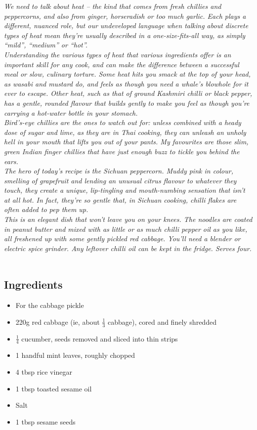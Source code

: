 \documentclass{book}
\begin{document}
\emph{We need to talk about heat – the kind that comes from fresh chillies and peppercorns, and also from ginger, horseradish or too much garlic. Each plays a different, nuanced role, but our undeveloped language when talking about discrete types of heat mean they’re usually described in a one-size-fits-all way, as simply “mild”, “medium” or “hot”.\\ 
Understanding the various types of heat that various ingredients offer is an important skill for any cook, and can make the difference between a successful meal or slow, culinary torture. Some heat hits you smack at the top of your head, as wasabi and mustard do, and feels as though you need a whale’s blowhole for it ever to escape. Other heat, such as that of ground Kashmiri chilli or black pepper, has a gentle, rounded flavour that builds gently to make you feel as though you’re carrying a hot-water bottle in your stomach.\\ 
Bird’s-eye chillies are the ones to watch out for: unless combined with a heady dose of sugar and lime, as they are in Thai cooking, they can unleash an unholy hell in your mouth that lifts you out of your pants. My favourites are those slim, green Indian finger chillies that have just enough buzz to tickle you behind the ears.\\ 
The hero of today’s recipe is the Sichuan peppercorn. Muddy pink in colour, smelling of grapefruit and lending an unusual citrus flavour to whatever they touch, they create a unique, lip-tingling and mouth-numbing sensation that isn’t at all hot. In fact, they’re so gentle that, in Sichuan cooking, chilli flakes are often added to pep them up.\\ 
This is an elegant dish that won’t leave you on your knees. The noodles are coated in peanut butter and mixed with as little or as much chilli pepper oil as you like, all freshened up with some gently pickled red cabbage. You’ll need a blender or electric spice grinder. Any leftover chilli oil can be kept in the fridge. Serves four.}\\\\ 
\subsection*{Ingredients}
\begin{itemize}
\item For the cabbage pickle
\item 220g red cabbage (ie, about $\frac{1}{3}$ cabbage), cored and finely shredded 
\item $\frac{1}{4}$ cucumber, seeds removed and sliced into thin strips
\item 1 handful mint leaves, roughly chopped
\item 4 tbsp rice vinegar
\item 1 tbsp toasted sesame oil
\item Salt
\item 1 tbsp sesame seeds
\end{itemize}
\end{document}
